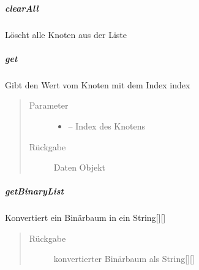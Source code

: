 \documentclass[letterpaper,10pt,ngerman]{sphinxmanual}
\begin{document}
\subparagraph{clearAll}
\label{\detokenize{com/linuxluigi/edu/list/BinaryLinkedList:clearall}}

\begin{fulllineitems}
\label{\detokenize{com/linuxluigi/edu/list/BinaryLinkedList:com.linuxluigi.edu.list.BinaryLinkedList.clearAll()}}
Löscht alle Knoten aus der Liste

\end{fulllineitems}



\subparagraph{get}
\label{\detokenize{com/linuxluigi/edu/list/BinaryLinkedList:get}}

\begin{fulllineitems}
\label{\detokenize{com/linuxluigi/edu/list/BinaryLinkedList:com.linuxluigi.edu.list.BinaryLinkedList.get(int)}}
Gibt den Wert vom Knoten mit dem Index index
\begin{quote}\begin{description}
\item[{Parameter}] \leavevmode\begin{itemize}
\item {} 
 -- Index des Knotens

\end{itemize}

\item[{Rückgabe}] \leavevmode
Daten Objekt

\end{description}\end{quote}

\end{fulllineitems}



\subparagraph{getBinaryList}
\label{\detokenize{com/linuxluigi/edu/list/BinaryLinkedList:getbinarylist}}

\begin{fulllineitems}
\label{\detokenize{com/linuxluigi/edu/list/BinaryLinkedList:com.linuxluigi.edu.list.BinaryLinkedList.getBinaryList()}}
Konvertiert ein Binärbaum in ein String{[}{]}{[}{]}
\begin{quote}\begin{description}
\item[{Rückgabe}] \leavevmode
konvertierter Binärbaum als String{[}{]}{[}{]}

\end{description}\end{quote}

\end{fulllineitems}
\end{document}

